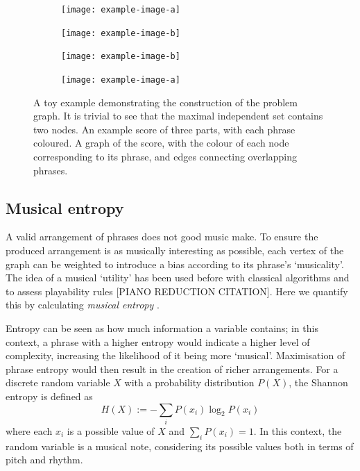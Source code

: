 \documentclass[12pt]{article}
\theoremstyle{definition}
\begin{document}
\begin{figure}
    \begin{subfigure}{0.5\textwidth}
        \texttt{[image: example-image-a]}
        \caption{}
        \label{fig:toy-phrases}
    \end{subfigure}\hfill
    \begin{subfigure}{0.5\textwidth}
        \texttt{[image: example-image-b]}
        \caption{}
        \label{fig:toy-graph}
    \end{subfigure}
    \begin{subfigure}{0.5\textwidth}
        \texttt{[image: example-image-b]}
        \caption{}
        \label{fig:toy-solution}
    \end{subfigure}\hfill
    \begin{subfigure}{0.5\textwidth}
        \texttt{[image: example-image-a]}
        \caption{}
        \label{fig:toy-arrangement}
    \end{subfigure}

    \caption[A toy example demonstrating the proposed framework]{A toy example demonstrating the construction of the problem graph. It is trivial to see that the maximal independent set contains two nodes.  An example score of three parts, with each phrase coloured.  A graph of the score, with the colour of each node corresponding to its phrase, and edges connecting overlapping phrases.}
    \label{fig:toy}
\end{figure}

\subsection{Musical entropy}

A valid arrangement of phrases does not good music make. To ensure the produced arrangement is as musically interesting as possible, each vertex of the graph can be weighted to introduce a bias according to its phrase's `musicality'. The idea of a musical `utility' has been used before with classical algorithms \cite{huang_towards_2012} and to assess playability rules [PIANO REDUCTION CITATION]. Here we quantify this by calculating \emph{musical entropy} \cite{li_entropy_2019}.

Entropy can be seen as how much information a variable contains; in this context, a phrase with a higher entropy would indicate a higher level of complexity, increasing the likelihood of it being more `musical'. Maximisation of phrase entropy would then result in the creation of richer arrangements. For a discrete random variable $X$ with a probability distribution $P(X)$, the Shannon entropy is defined as
\begin{equation}
    H(X):=-\sum_i P(x_i)\log_2 P(x_i)
    \label{eq:entropy}
\end{equation}
where each $x_i$ is a possible value of $X$ and ${\sum_i P(x_i)=1}$. In this context, the random variable is a musical note, considering its possible values both in terms of pitch and rhythm.
\end{document}
